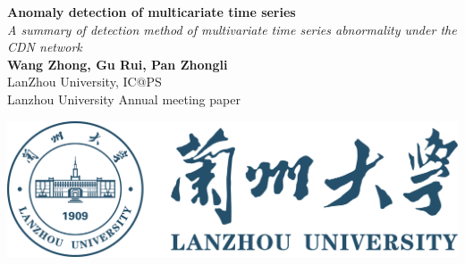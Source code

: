 \documentclass[a0,portrait]{a0poster}
\begin{document}


\begin{minipage}[b]{0.75\linewidth}
\Huge \color{NavyBlue} \textbf{Anomaly detection of multicariate time series} \color{Black}\\ %
\LARGE \textit{A summary of detection method of multivariate time series abnormality under the CDN network}\\[2cm] %
\LARGE \textbf{Wang Zhong, Gu Rui, Pan Zhongli}\\[0.5cm] %
\LARGE LanZhou University, IC@PS\\ [0.4cm] %
\large Lanzhou University Annual meeting paper 
\\
\end{minipage}
%
\hspace{-5.5cm}\begin{minipage}[b]{0.3\linewidth}
\includegraphics[scale=2.5]{lzu.png}
\end{minipage}

\vspace{1cm} %

\end{document}
